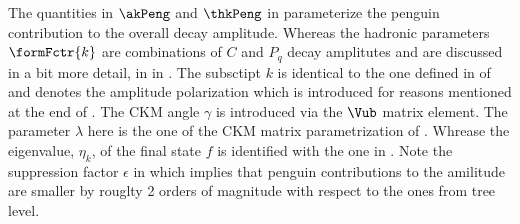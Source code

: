 \noindent The quantities in $\akPeng$ and $\thkPeng$ in  parameterize the penguin contribution to the overall \BsJpsiPhi
decay amplitude. Whereas the hadronic parameters $\formFctr{k}$ are combinations of $C$ and $P_q$ decay amplitutes and are discussed
in a bit more detail, in in .
The subsctipt $k$ is identical to the one defined in  of  and denotes the \BsJpsiPhi
amplitude polarization which is introduced for reasons mentioned at the end of .
The CKM angle $\gamma$ is introduced via the $\Vub$ matrix element. The parameter $\lambda$ here is the one of the
CKM matrix parametrization of . Whrease the eigenvalue, $\eta_k$, of the final state $f$ is identified with the one in .
Note the suppression factor $\epsilon$ in  which implies that penguin contributions to the \BsJpsiPhi amilitude are smaller
by rouglty 2 orders of magnitude with respect to the ones from tree level.
